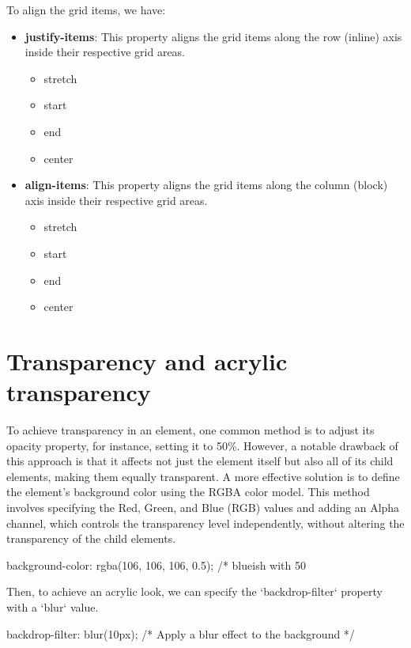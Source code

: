 \documentclass{report}
\begin{document}
    \bigbreak \noindent 
    To align the grid items, we have:
    \begin{itemize}
        \item \textbf{justify-items}: This property aligns the grid items along the row (inline) axis inside their respective grid areas.
            \begin{itemize}
                \item stretch
                \item start
                \item end
                \item center
            \end{itemize}
        \item \textbf{align-items}: This property aligns the grid items along the column (block) axis inside their respective grid areas.
            \begin{itemize}
                \item stretch
                \item start
                \item end
                \item center
            \end{itemize}
    \end{itemize}

    \bigbreak \noindent 

    \pagebreak \bigbreak \noindent 
    \section{\LARGE Transparency and acrylic transparency}
    \bigbreak \noindent 
    To achieve transparency in an element, one common method is to adjust its opacity property, for instance, setting it to 50\%. However, a notable drawback of this approach is that it affects not just the element itself but also all of its child elements, making them equally transparent. A more effective solution is to define the element's background color using the RGBA color model. This method involves specifying the Red, Green, and Blue (RGB) values and adding an Alpha channel, which controls the transparency level independently, without altering the transparency of the child elements.
    \begin{concept}
        \bigbreak \noindent 
        \begin{csscode}
            background-color: rgba(106, 106, 106, 0.5); /* blueish with 50%
        \end{csscode}
    \end{concept}
    \bigbreak \noindent 
    Then, to achieve an acrylic look, we can specify the `backdrop-filter` property with a `blur` value.
    \bigbreak \noindent 
    \begin{csscode}
        backdrop-filter: blur(10px); /* Apply a blur effect to the background */
    \end{csscode}
\end{document}
